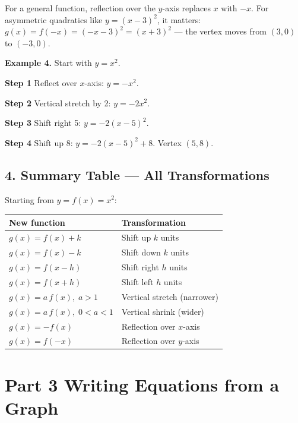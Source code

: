 \documentclass[11pt]{article}
\begin{document}
\medskip
For a general function, reflection over the $y$-axis replaces $x$ with $-x$.
For asymmetric quadratics like $y = (x-3)^2$, it matters:
$g(x) = f(-x) = (-x-3)^2 = (x+3)^2$ --- the vertex moves from $(3,0)$ to $(-3,0)$.

\begin{exbox}
\textbf{Example 4.} Start with $y = x^2$.

\textbf{Step 1} Reflect over $x$-axis: $y = -x^2$.

\textbf{Step 2} Vertical stretch by 2: $y = -2x^2$.

\textbf{Step 3} Shift right 5: $y = -2(x-5)^2$.

\textbf{Step 4} Shift up 8: $y = -2(x-5)^2 + 8$. \quad Vertex $(5, 8)$.
\end{exbox}

\subsection*{4. \; Summary Table --- All Transformations}

Starting from $y = f(x) = x^2$:

\begin{center}
\renewcommand{\arraystretch}{1.6}
\begin{tabular}{|l|l|}
\hline
\textbf{New function} & \textbf{Transformation} \\
\hline
$g(x) = f(x) + k$     & Shift up $k$ units \\
$g(x) = f(x) - k$     & Shift down $k$ units \\
$g(x) = f(x - h)$     & Shift right $h$ units \\
$g(x) = f(x + h)$     & Shift left $h$ units \\
$g(x) = a\,f(x),\; a>1$    & Vertical stretch (narrower) \\
$g(x) = a\,f(x),\; 0<a<1$  & Vertical shrink (wider) \\
$g(x) = -f(x)$        & Reflection over $x$-axis \\
$g(x) = f(-x)$        & Reflection over $y$-axis \\
\hline
\end{tabular}
\end{center}

\section*{Part 3 \quad Writing Equations from a Graph}
\end{document}
